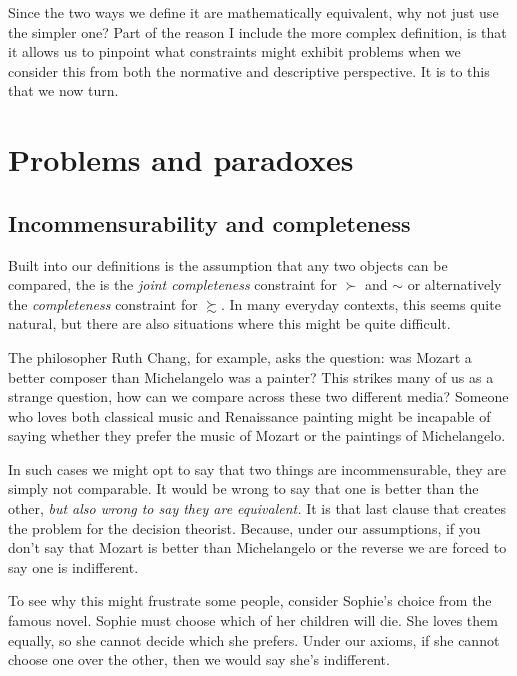 Since the two ways we define it are mathematically equivalent, why not just use the simpler one?  Part of the reason I include the more complex definition, is that it allows us to pinpoint  what constraints might exhibit problems when we consider this from both the normative and descriptive perspective.  It is to this that we now turn.

\section{Problems and paradoxes}

\subsection{Incommensurability and completeness}

Built into our definitions is the assumption that any two objects can be compared, the is the {\it joint completeness} constraint for $\succ$ and $\sim$ or alternatively the {\it completeness} constraint for $\succsim$.  In many everyday contexts, this seems quite natural, but there are also situations where this might be quite difficult.  

The philosopher Ruth Chang, for example, asks the question: was Mozart a better composer than Michelangelo was a painter?  This strikes many of us as a strange question, how can we compare across these two different media?  Someone who loves both classical music and Renaissance painting might be incapable of saying whether they prefer the music of Mozart or the paintings of Michelangelo.  

In such cases we might opt to say that two things are incommensurable, they are simply not comparable.  It would be wrong to say that one is better than the other, {\it but also wrong to say they are equivalent.}  It is that last clause that creates the problem for the decision theorist.  Because, under our assumptions, if you don't say that Mozart is better than Michelangelo or the reverse we are forced to say one is indifferent.

To see why this might frustrate some people, consider Sophie's choice from the famous novel.  Sophie must choose which of her children will die.  She loves them equally, so she cannot decide which she prefers.  Under our axioms, if she cannot choose one over the other, then we would say she's indifferent.  

